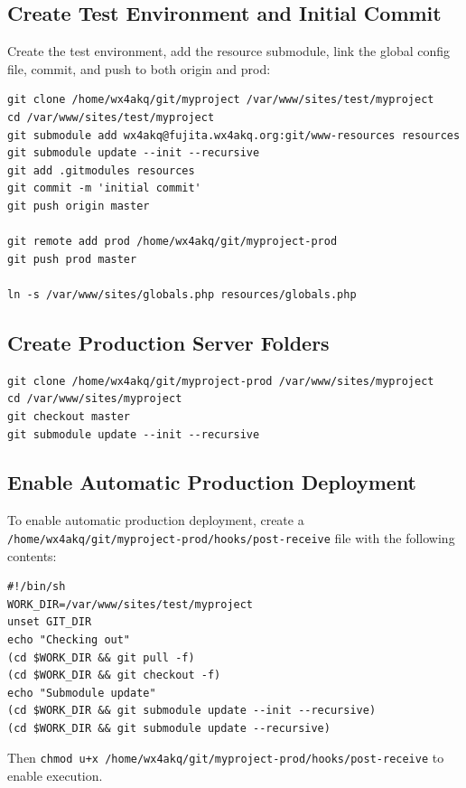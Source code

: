 \documentclass[pdflatex,letterpaper,twoside,12pt]{book}
\begin{document}
\subsection{Create Test Environment and Initial Commit}

Create the test environment, add the resource submodule, link the global config file, commit, and push to both origin and prod:

\begin{lstlisting}
git clone /home/wx4akq/git/myproject /var/www/sites/test/myproject
cd /var/www/sites/test/myproject
git submodule add wx4akq@fujita.wx4akq.org:git/www-resources resources
git submodule update --init --recursive
git add .gitmodules resources
git commit -m 'initial commit'
git push origin master

git remote add prod /home/wx4akq/git/myproject-prod
git push prod master

ln -s /var/www/sites/globals.php resources/globals.php
\end{lstlisting}

\subsection{Create Production Server Folders}

\begin{lstlisting}
git clone /home/wx4akq/git/myproject-prod /var/www/sites/myproject
cd /var/www/sites/myproject
git checkout master
git submodule update --init --recursive
\end{lstlisting}

\subsection{Enable Automatic Production Deployment}

To enable automatic production deployment, create a \texttt{/home/wx4akq/git/myproject-prod/hooks/post-receive} file with the following contents:

\begin{lstlisting}
#!/bin/sh
WORK_DIR=/var/www/sites/test/myproject
unset GIT_DIR
echo "Checking out"
(cd $WORK_DIR && git pull -f)
(cd $WORK_DIR && git checkout -f)
echo "Submodule update"
(cd $WORK_DIR && git submodule update --init --recursive)
(cd $WORK_DIR && git submodule update --recursive)
\end{lstlisting}

Then \texttt{chmod u+x /home/wx4akq/git/myproject-prod/hooks/post-receive} to enable execution.
\end{document}
